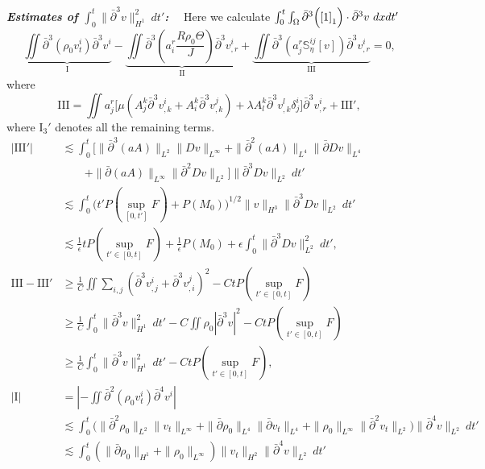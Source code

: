 \documentclass[12pt,a4paper]{amsart}
\numberwithin{equation}{section}
\theoremstyle{plain}
\theoremstyle{definition}
\newcommand{\bpartial}{\bar{\partial}}
\begin{document}
\vspace{0.3cm}

\textsl{\textbf{Estimates of $\int_{0}^{t}\|\bpartial^3 v\|_{H^1}^2 \ dt'$:}}~~
Here we calculate
$\int_{0}^{t}\int_{\Omega}\bpartial^3 \Big(\eqref{1}_1\Big)\cdot \bpartial^3 v \ dx dt'$
$$
\underbrace{\iint \bpartial^3 (\rho_0 v^i_t) \bpartial^3 v^i}_{\mathrm{I}} 
-\underbrace{\iint \bpartial^3 (a^r_i\frac{R\rho_0\Theta}{J})\bpartial^3 v^i_{,r}}_{\mathrm{II}}
+\underbrace{\iint \bpartial^3 (a^r_j\mathbb{S}^{ij}_{\eta}[v])\bpartial^3 v^i_{,r}}_{\mathrm{III}}=0,
$$
where
$$
\mathrm{III}=\iint a^r_j\Big[\mu (A^{k}_j \bpartial^3 v^i_{,k}+A^k_i \bpartial^3 v^j_{,k})+\lambda A_l^k \bpartial^3 v^l_{,k}\delta^i_j\Big]\bpartial^3 v^i_{,r}+\mathrm{III}',
$$
where $\mathrm{I}_3'$ denotes all the remaining terms.
\begin{align*}
|\mathrm{III}'|
&\lesssim  \int_{0}^{t} \bigg[ \|\bpartial^3 (aA)\|_{L^2}\|Dv\|_{L^{\infty}}
     + \|\bpartial^2 (aA)\|_{L^4}\|\bpartial Dv\|_{L^4}
     \\
     &\qquad+ \|\bpartial (aA)\|_{L^{\infty}}\|\bpartial^2 Dv\|_{L^2}
       \bigg] \|\bpartial^3 Dv\|_{L^2}\ dt'\\ 
&\lesssim \int_{0}^{t} \Big( t'P(\sup\limits_{[0,t']}F)+P(M_0)  \Big)^{1/2}\|v\|_{H^3} \|\bpartial^3 Dv\|_{L^2}\ dt'\\
&\lesssim  \frac{1}{\epsilon}tP(\sup\limits_{t'\in[0,t]}F)+\frac{1}{\epsilon}P(M_0)+\epsilon \int_{0}^{t}\|\bpartial^3 Dv\|_{L^2}^2\ dt',\\
\mathrm{III}-\mathrm{III}'
&\geq\frac{1}{C}\iint\sum\limits_{i,j}(\bpartial^3 v^i_{,j}+\bpartial^3 v^j_{,i})^2-CtP(\sup\limits_{t'\in[0,t]}F)\\
&\geq \frac{1}{C}\int_{0}^{t}\|\bpartial^3 v\|_{H^1}^2\ dt'-C\iint \rho_0 |\bpartial^3 v|^2-CtP(\sup\limits_{t'\in[0,t]}F)\\
&\geq \frac{1}{C}\int_{0}^{t}\|\bpartial^3 v\|_{H^1}^2\ dt'-CtP(\sup\limits_{t'\in[0,t]}F),\\
|\mathrm{I}|&=\left| -\iint \bpartial^2(\rho_0 v^i_t)\bpartial^4 v^i   \right|\\
&\lesssim  \int_{0}^{t} \Big(\|\bpartial^2 \rho_0\|_{L^2}\|v_t\|_{L^{\infty}}+\|\bpartial \rho_0\|_{L^4}\|\bpartial v_t\|_{L^4}+\|\rho_0\|_{L^{\infty}}\|\bpartial^2 v_t\|_{L^2}\Big)\|\bpartial^4 v\|_{L^2}\ dt'\\
&\lesssim  \int_{0}^{t} (\|\bpartial\rho_0\|_{H^1}+\|\rho_0\|_{L^\infty})\|v_t\|_{H^2}\|\bpartial^4 v\|_{L^2}\ dt'\\

\end{align*}
\end{document}
